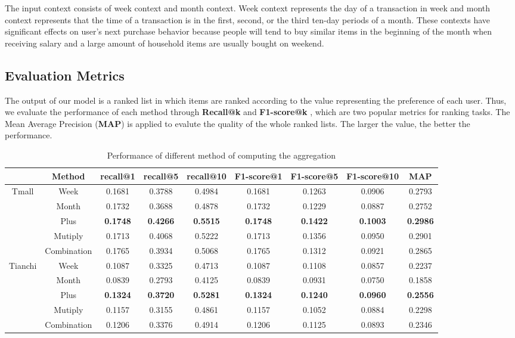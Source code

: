 \documentclass[conference]{IEEEtran}
\begin{document}
The input context consists of week context and month context. Week context represents the day of a transaction in week and month context represents that the time of a transaction is in the first, second, or the third ten-day periods of a month. These contexts have significant effects on user's next purchase behavior because people will tend to buy similar items in the beginning of the month when receiving salary and a large amount of household items are usually bought on weekend.


\subsection{Evaluation Metrics}
The output of our model is a ranked list in which items are ranked according to the value representing the preference of each user. Thus, we evaluate the performance of each method through \textbf{Recall@k} and \textbf{F1-score@k} , which are two popular metrics for ranking tasks. The Mean Average Precision (\textbf{MAP}) is applied to evalute the quality of the whole ranked lists. The larger the value, the better the performance.

\begin{table}[!htbp]
\centering\scriptsize
\caption{Performance of different method of computing the aggregation}
    \begin{tabular}{ccccccccc}
    \toprule
          & Method& recall@1 & recall@5 & recall@10&F1-score@1 & F1-score@5 & F1-score@10&MAP\\
    \midrule
    \multirow{5}[0]{*}{Tmall} 
        &Week& 0.1681& 0.3788& 0.4984& 0.1681& 0.1263& 0.0906&0.2793\\
        &Month& 0.1732& 0.3688& 0.4878& 0.1732& 0.1229& 0.0887&0.2752\\
        &Plus& \textbf{0.1748}& \textbf{0.4266}& \textbf{0.5515}& \textbf{0.1748}& \textbf{0.1422}& \textbf{0.1003}& \textbf{0.2986}\\
        &Mutiply& 0.1713& 0.4068& 0.5222& 0.1713& 0.1356& 0.0950&0.2901\\
        &Combination& 0.1765& 0.3934& 0.5068& 0.1765& 0.1312& 0.0921&0.2865\\
    \midrule
    \multirow{5}[0]{*}{Tianchi} 
        &Week& 0.1087& 0.3325& 0.4713& 0.1087& 0.1108& 0.0857&0.2237\\
        &Month& 0.0839& 0.2793& 0.4125& 0.0839& 0.0931& 0.0750&0.1858\\
        &Plus& \textbf{0.1324}& \textbf{0.3720}& \textbf{0.5281}& \textbf{0.1324}& \textbf{0.1240}& \textbf{0.0960}& \textbf{0.2556}\\
        &Mutiply& 0.1157& 0.3155& 0.4861& 0.1157& 0.1052& 0.0884&0.2298\\
        &Combination& 0.1206& 0.3376& 0.4914& 0.1206& 0.1125& 0.0893&0.2346\\
    \bottomrule
\end{tabular}%
\end{table}%
\end{document}
